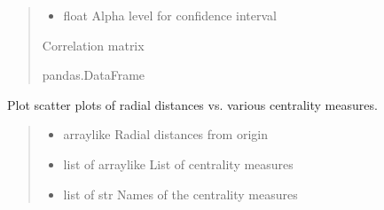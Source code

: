 \documentclass[letterpaper,10pt,english]{sphinxmanual}
\begin{document}
\begin{fulllineitems}
\begin{quote}
\begin{description}
\begin{itemize}
\item {} 
\sphinxAtStartPar
{} \textendash{} float
Alpha level for confidence interval

\end{itemize}

\sphinxAtStartPar
Correlation matrix

\sphinxAtStartPar
pandas.DataFrame

\end{description}\end{quote}

\end{fulllineitems}


\begin{fulllineitems}
\label{\detokenize{api_reference:graphem.visualization.plot_radial_vs_centrality}}
\pysigstartsignatures
{}
\pysigstopsignatures
\sphinxAtStartPar
Plot scatter plots of radial distances vs. various centrality measures.
\begin{quote}\begin{description}
\begin{itemize}
\item {} 
\sphinxAtStartPar
{} \textendash{} array\sphinxhyphen{}like
Radial distances from origin

\item {} 
\sphinxAtStartPar
{} \textendash{} list of array\sphinxhyphen{}like
List of centrality measures

\item {} 
\sphinxAtStartPar
{} \textendash{} list of str
Names of the centrality measures

\end{itemize}

\end{description}\end{quote}

\end{fulllineitems}
\end{document}
